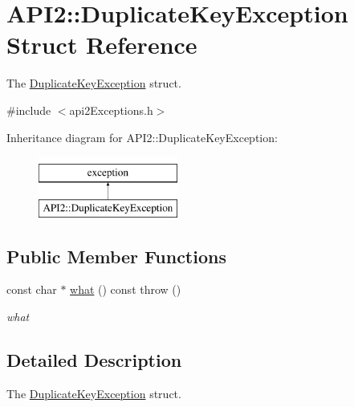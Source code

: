 \hypertarget{struct_a_p_i2_1_1_duplicate_key_exception}{\section{A\-P\-I2\-:\-:Duplicate\-Key\-Exception Struct Reference}
\label{struct_a_p_i2_1_1_duplicate_key_exception}
}


The \hyperlink{struct_a_p_i2_1_1_duplicate_key_exception}{Duplicate\-Key\-Exception} struct.  




{\ttfamily \#include $<$api2\-Exceptions.\-h$>$}

Inheritance diagram for A\-P\-I2\-:\-:Duplicate\-Key\-Exception\-:\begin{figure}[H]
\begin{center}
\leavevmode
\includegraphics[height=2.000000cm]{struct_a_p_i2_1_1_duplicate_key_exception}
\end{center}
\end{figure}
\subsection*{Public Member Functions}
\begin{DoxyCompactItemize}
\item 
const char $\ast$ \hyperlink{struct_a_p_i2_1_1_duplicate_key_exception_a4a73163379f369311af54eaae74096ee}{what} () const   throw ()
\begin{DoxyCompactList}\small\item\em what \end{DoxyCompactList}\end{DoxyCompactItemize}


\subsection{Detailed Description}
The \hyperlink{struct_a_p_i2_1_1_duplicate_key_exception}{Duplicate\-Key\-Exception} struct. 

